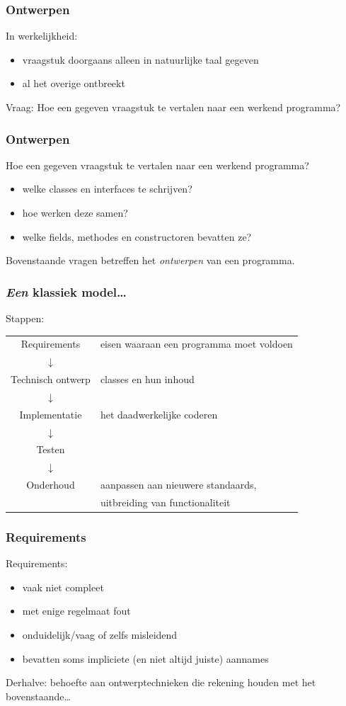 \documentclass{beamer}
\begin{document}
\begin{frame}
\frametitle{Ontwerpen}
In werkelijkheid:\pause
\begin{itemize}
\item vraagstuk doorgaans alleen in natuurlijke taal gegeven
\item al het overige ontbreekt\pause
\end{itemize}
Vraag: Hoe een gegeven vraagstuk te vertalen naar een werkend programma?
\end{frame}

\begin{frame}
\frametitle{Ontwerpen}
Hoe een gegeven vraagstuk te vertalen naar een werkend programma?\pause
\begin{itemize}
\item welke classes en interfaces te schrijven?\pause
\item hoe werken deze samen?\pause
\item welke fields, methodes en constructoren bevatten ze?\pause
\end{itemize}
Bovenstaande vragen betreffen het \emph{ontwerpen} van een programma. 
\end{frame}

\begin{frame}
\frametitle{\emph{Een} klassiek model\ldots}
Stappen:
\begin{tabular}{|c|l|}
\hline
Requirements&eisen waaraan een programma moet voldoen\\
$\downarrow$&\\
\hline
Technisch ontwerp&classes en hun inhoud\\
$\downarrow$&\\
\hline
Implementatie&het daadwerkelijke coderen\\
$\downarrow$&\\
\hline
Testen&\\
$\downarrow$&\\
\hline
Onderhoud&aanpassen aan nieuwere standaards,\\
&uitbreiding van functionaliteit\\
\hline
\end{tabular}
\end{frame}

\begin{frame}
\frametitle{Requirements}
Requirements:
\begin{itemize}
\item vaak niet compleet\pause
\item met enige regelmaat fout\pause
\item onduidelijk/vaag of zelfs misleidend\pause
\item bevatten soms impliciete (en niet altijd juiste) aannames \pause
\end{itemize}
Derhalve: behoefte aan ontwerptechnieken die rekening houden met het bovenstaande\ldots
\end{frame}
\end{document}
